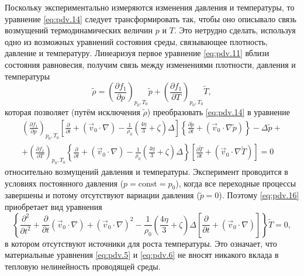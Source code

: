 Поскольку экспериментально измеряются изменения давления и температуры, то уравнение \eqref{eq:pdv.14} следует трансформировать так, чтобы оно описывало связь возмущений термодинамических величин $p$ и $T$. Это нетрудно сделать, используя одно из возможных уравнений состояния среды, связывающее плотность, давление и температуру. Линеаризуя первое уравнение \eqref{eq:pdv.11} вблизи состояния равновесия, получим связь между изменениями плотности, давления и температуры
\begin{equation}
	\label{eq:pdv.15}
	\tilde{\rho}=\left(\frac{\partial f_{1}}{\partial p}\right)_{p_{0}, T_{0}} \tilde{p}+\left(\frac{\partial f_{1}}{\partial T}\right)_{p_{0}, T_{0}} \tilde{T},
\end{equation}
которая позволяет (путём исключения $\tilde{\rho}$) преобразовать \eqref{eq:pdv.14} в уравнение
\begin{equation}
	\label{eq:pdv.16}
	\begin{array}{l}
	\left(\frac{\partial f_{1}}{\partial p}\right)_{p_{0}, T_{0}}\left[\frac{\partial}{\partial t}+\left(\vec{v}_{0} \cdot \nabla\right)-\frac{1}{\rho_{0}}\left(\frac{4 \eta}{3}+\zeta\right) \Delta\right]\left\{\frac{\partial \tilde{p}}{\partial t}+\left(\vec{v}_{0} \cdot \nabla \tilde{p}\right)\right\}-\Delta \tilde{p}+ \\
	+\left(\frac{\partial f_{1}}{\partial T}\right)_{p_{0}, T_{0}}\left\{\frac{\partial}{\partial t}+\left(\vec{v}_{0} \cdot \nabla\right)-\frac{1}{\rho_{0}}\left(\frac{4 \eta}{3}+\zeta\right) \Delta\right\}\left[\frac{\partial \tilde{T}}{\partial t}+\left(\vec{v}_{0} \cdot \nabla \tilde{T}\right)\right]=0
\end{array}
\end{equation}
относительно возмущений давления и температуры. Эксперимент проводится в условиях постоянного давления ($p = \mathrm{const} = p_0 $), когда все переходные процессы завершены и потому отсутствуют вариации давления ($\tilde{p}=0$). Поэтому \eqref{eq:pdv.16} приобретает вид уравнения
\begin{equation}
	\label{eq:pdv.17}
	\left\{\frac{\partial^{2}}{\partial t^{2}}+\frac{\partial}{\partial t}\left(\vec{v}_{0} \cdot \nabla\right)+\left(\vec{v}_{0} \cdot \nabla\right)^{2}-\frac{1}{\rho_{0}}\left(\frac{4 \eta}{3}+\zeta\right) \Delta\left[\frac{\partial}{\partial t}+\left(\vec{v}_{0} \cdot \nabla\right)\right]\right\} \tilde{T}=0,
\end{equation}
в котором отсутствуют источники для роста температуры. Это означает, что материальные уравнения \eqref{eq:pdv.5} и \eqref{eq:pdv.6} не вносят никакого вклада в тепловую нелинейность проводящей среды.

